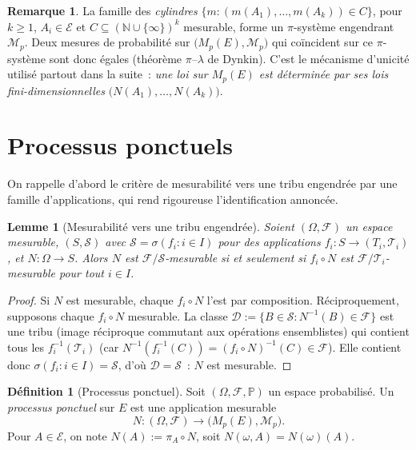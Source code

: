 \documentclass[11pt,a4paper]{article}
\theoremstyle{plain}
\newtheorem{lemme}[theoreme]{Lemme}
\theoremstyle{definition}
\newtheorem{definition}[theoreme]{Définition}
\newtheorem{remarque}[theoreme]{Remarque}
\newcommand{\N}{\mathbb{N}}
\newcommand{\PP}{\mathbb{P}}
\newcommand{\Mp}{M_p}
\newcommand{\calE}{\mathcal{E}}
\newcommand{\calM}{\mathcal{M}}
\newcommand{\calF}{\mathcal{F}}
\newcommand{\calS}{\mathcal{S}}
\newcommand{\calD}{\mathcal{D}}
\newcommand{\calT}{\mathcal{T}}
\begin{document}
\begin{remarque}
La famille des \emph{cylindres}
$\{m : (m(A_1),\dots,m(A_k))\in C\}$, pour $k\ge 1$, $A_i\in\calE$ et $C\subseteq(\N\cup\{\infty\})^k$ mesurable, forme un $\pi$-système engendrant $\calM_p$. Deux mesures de probabilité sur $\big(\Mp(E),\calM_p\big)$ qui coïncident sur ce $\pi$-système sont donc égales (théorème $\pi$--$\lambda$ de Dynkin). C'est le mécanisme d'unicité utilisé partout dans la suite~: \emph{une loi sur $\Mp(E)$ est déterminée par ses lois fini-dimensionnelles} $\big(N(A_1),\dots,N(A_k)\big)$.
\end{remarque}

\section{Processus ponctuels}

On rappelle d'abord le critère de mesurabilité vers une tribu engendrée par une famille d'applications, qui rend rigoureuse l'identification annoncée.

\begin{lemme}[Mesurabilité vers une tribu engendrée]\label{lem:engendre}
Soient $(\Omega,\calF)$ un espace mesurable, $(S,\calS)$ avec $\calS=\sigma(f_i:i\in I)$ pour des applications $f_i:S\to(T_i,\calT_i)$, et $N:\Omega\to S$. Alors $N$ est $\calF/\calS$-mesurable si et seulement si $f_i\circ N$ est $\calF/\calT_i$-mesurable pour tout $i\in I$.
\end{lemme}

\begin{proof}
Si $N$ est mesurable, chaque $f_i\circ N$ l'est par composition. Réciproquement, supposons chaque $f_i\circ N$ mesurable. La classe $\calD:=\{B\in\calS:N^{-1}(B)\in\calF\}$ est une tribu (image réciproque commutant aux opérations ensemblistes) qui contient tous les $f_i^{-1}(\calT_i)$ (car $N^{-1}(f_i^{-1}(C))=(f_i\circ N)^{-1}(C)\in\calF$). Elle contient donc $\sigma(f_i:i\in I)=\calS$, d'où $\calD=\calS$~: $N$ est mesurable.
\end{proof}

\begin{definition}[Processus ponctuel]\label{def:pp}
Soit $(\Omega,\calF,\PP)$ un espace probabilisé. Un \emph{processus ponctuel} sur $E$ est une application mesurable
\[
N:(\Omega,\calF)\longrightarrow \big(\Mp(E),\calM_p\big).
\]
Pour $A\in\calE$, on note $N(A):=\pi_A\circ N$, soit $N(\omega,A)=N(\omega)(A)$.
\end{definition}
\end{document}

